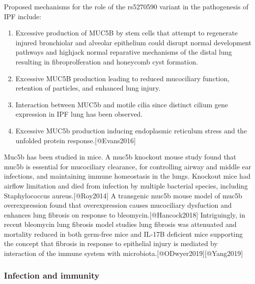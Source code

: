 \documentclass[
]{article}
\providecommand{\tightlist}{%
  \setlength{\itemsep}{0pt}\setlength{\parskip}{0pt}}
\begin{document}
Proposed mechanisms for the role of the rs5270590 variant in the
pathogenesis of IPF include:

\begin{enumerate}
\def\labelenumi{\arabic{enumi}.}
\tightlist
\item
  Excessive production of MUC5B by stem cells that attempt to regenerate
  injured bronchiolar and alveolar epithelium could disrupt normal
  development pathways and highjack normal reparative mechanisms of the
  distal lung resulting in fibroprolferation and honeycomb cyst
  formation.
\item
  Excessive MUC5B production leading to reduced mucociliary function,
  retention of particles, and enhanced lung injury.
\item
  Interaction between MUC5b and motile cilia since distinct cilium gene
  expression in IPF lung has been observed.
\item
  Excessive MUC5b production inducing endoplasmic reticulum stress and
  the unfolded protein response.{[}@Evans2016{]}
\end{enumerate}

Muc5b has been studied in mice. A muc5b knockout mouse study found that
muc5b is essential for mucociliary clearance, for controlling airway and
middle ear infections, and maintaining immune homeostasis in the lungs.
Knockout mice had airflow limitation and died from infection by multiple
bacterial species, including Staphylococcus aureus.{[}@Roy2014{]} A
transgenic muc5b mouse model of muc5b overexpression found that
overexpression causes mucociliary dysfuction and enhances lung fibrosis
on response to bleomycin.{[}@Hancock2018{]} Intriguingly, in recent
bleomycin lung fibrosis model studies lung fibrosis was attenuated and
mortality reduced in both germ-free mice and IL-17B deficient mice
supporting the concept that fibrosis in response to epithelial injury is
mediated by interaction of the immune system with
microbiota.{[}@ODwyer2019{]}{[}@Yang2019{]}

\hypertarget{infection-and-immunity}{%
\subsubsection{Infection and immunity}\label{infection-and-immunity}}
\end{document}

